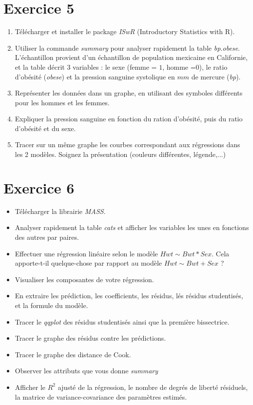 \documentclass[a4paper]{article}
\begin{document}
\section{Exercice 5}

\begin{enumerate}
\item Télécharger et installer le package \textit{ISwR} (Introductory Statistics with R).
\item Utiliser la commande \textit{summary} pour analyser rapidement la table \textit{bp.obese}. L'échantillon provient d'un échantillon de population mexicaine en Californie, et la table décrit $3$ variables : le sexe (femme = $1$, homme =$0$), le ratio d'obésité (\textit{obese}) et la pression sanguine systolique en $mm$ de mercure (\textit{bp}).
\item Représenter les données dans un graphe, en utilisant des symboles différents pour les hommes et les femmes.
\item Expliquer la pression sanguine en fonction du ration d'obésité, puis du ratio d'obésité et du sexe.
\item Tracer sur un même graphe les courbes correspondant aux régressions dans les 2 modèles. Soignez la présentation (couleurs différentes, légende,...)
\end{enumerate}

\section{Exercice 6}
\begin{itemize}
\item Télécharger la librairie \textit{MASS}.
\item Analyser rapidement la table \textit{cats} et afficher les variables les unes en fonctions des autres par paires.
\item Effectuer une régression linéaire selon le modèle $Hwt \sim Bwt * Sex $. Cela apporte-t-il quelque-chose par rapport au modèle $Hwt \sim Bwt + Sex $ ? 
\item Visualiser les composantes de votre régression.
\item En extraire les prédiction, les coefficients, les résidus, lés résidus studentisés, et la formule du modèle.
\item Tracer le \textit{qqplot} des résidus studentisés ainsi que la première bissectrice.
\item Tracer le graphe des résidus contre les prédictions.
\item Tracer le graphe des distance de Cook.
\item Observer les attributs que vous donne \textit{summary}
\item Afficher le $R^2$ ajusté de la régression, le nombre de degrés de liberté résiduels, la matrice de variance-covariance des paramètres estimés. 
\end{itemize}
\end{document}
